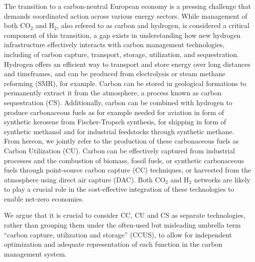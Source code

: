 \documentclass[twocolumn]{article}
\newcommand{\COtwo}{CO$_2$}
\newcommand{\Htwo}{H$_2$}
\begin{document}
The transition to a carbon-neutral European economy is a pressing challenge that demands coordinated action across various energy sectors. While management of both \COtwo{} and \Htwo{}, also refered to as carbon and hydrogen, is considered a critical component of this transition, a gap exists in understanding how new hydrogen infrastructure effectively interacts with carbon management technologies, including of carbon capture, transport, storage, utilization, and sequestration. Hydrogen offers an efficient way to transport and store energy over long distances and timeframes, and can be produced from electrolysis or steam methane reforming (SMR), for example. Carbon can be stored in geological formations to permanently extract it from the atmosphere, a process known as carbon sequestration (CS). Additionally, carbon can be combined with hydrogen to produce carbonaceous fuels as for example needed for aviation in form of synthetic kerosene from Fischer-Tropsch synthesis, for shipping in form of synthetic methanol and for industrial feedstocks through synthetic methane. From hereon, we jointly refer to the production of these carbonaceous fuels as Carbon Utilization (CU). Carbon can be effectively captured from industrial processes and the combustion of biomass, fossil fuels, or synthetic carbonaceous fuels through point-source carbon capture (CC) techniques, or harvested from the atmosphere using direct air capture (DAC). Both \COtwo{} and \Htwo{} networks are likely to play a crucial role in the cost-effective integration of these technologies to enable net-zero economies.

We argue that it is crucial to consider CC, CU and CS as separate technologies, rather than grouping them under the often-used but misleading umbrella term ``carbon capture, utilization and storage'' (CCUS), to allow for independent optimization and adequate representation of each function in the carbon management system.
\end{document}
